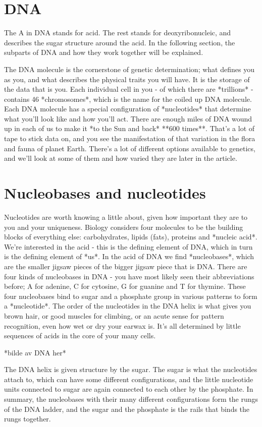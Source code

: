\section{DNA}
The A in DNA stands for acid. The rest stands for deoxyribonucleic, and describes the sugar structure around the acid. In the following section, the subparts of DNA and how they work together will be explained. 

The DNA molecule is the cornerstone of genetic determination; what defines you as you, and what describes the physical traits you will have.  It is the storage of the data that is you. Each individual cell in you - of which there are *trillions* - contains 46 *chromosomes*, which is the name for the coiled up DNA molecule. Each DNA molecule has a special configuration of *nucleotides* that determine what you'll look like and how you'll act. There are enough miles of DNA wound up in each of us to make it *to the Sun and back* **600 times**. That's a lot of tape to stick data on, and you see the manifestation of that variation in the flora and fauna of planet Earth. There's a lot of different options available to genetics, and we'll look at some of them and how varied they are later in the article. 

\section{Nucleobases and nucleotides}
Nucleotides are worth knowing a little about, given how important they are to you and your uniqueness. Biology considers four molecules to be the building blocks of everything else: carbohydrates, lipids (fats), proteins and *nucleic acid*. We're interested in the acid - this is the defining element of DNA, which in turn is the defining element of *us*. In the acid of DNA we find *nucleobases*, which are the smaller jigsaw pieces of the bigger jigsaw piece that is DNA. There are four kinds of nucleobases in DNA - you have most likely seen their abbreviations before; A for adenine, C for cytosine, G for guanine and T for thymine. These four nucleobases bind to sugar and a phosphate group in various patterns to form a *nucleotide*. The order of the nucleotides in the DNA helix is what gives you brown hair, or good muscles for climbing, or an acute sense for pattern recognition, even how wet or dry your earwax is. It's all determined by little sequences of acids in the core of your many cells.

*bilde av DNA her*

The DNA helix is given structure by the sugar. The sugar is what the nucleotides attach to, which can have some different configurations, and the little nucleotide units connected to sugar are again connected to each other by the phosphate. In summary, the nucleobases with their many different configurations form the rungs of the DNA ladder, and the sugar and the phosphate is the rails that binds the rungs together.

